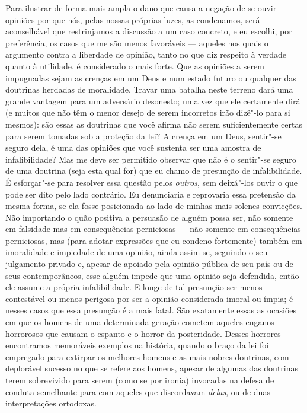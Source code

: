 Para ilustrar de forma mais ampla o dano que causa a negação de se ouvir
opiniões por que nós, pelas nossas próprias luzes, as condenamos, será
aconselhável que restrinjamos a discussão a um caso concreto, e eu
escolhi, por preferência, os casos que me são menos favoráveis ---
aqueles nos quais o argumento contra a liberdade de opinião, tanto no
que diz respeito à verdade quanto à utilidade, é
considerado o mais forte. Que as opiniões a serem impugnadas sejam
as crenças em um Deus e num estado futuro ou qualquer das doutrinas
herdadas de moralidade. Travar uma batalha neste terreno dará uma
grande vantagem para um adversário desonesto; uma vez que ele certamente
dirá (e muitos que não têm o menor desejo de serem incorretos irão
dizê"-lo para si mesmos): são essas as doutrinas que você afirma não
serem suficientemente certas para serem tomadas sob a proteção da lei?
A crença em um Deus, sentir"-se seguro dela, é uma das opiniões que você
sustenta ser uma amostra de infalibilidade? Mas me deve ser permitido
observar que não é o sentir"-se seguro de uma doutrina (seja esta qual
for) que eu chamo de presunção de infalibilidade. É esforçar"-se para
resolver essa questão pelos \textit{outros}, sem deixá"-los ouvir o
que pode ser dito pelo lado contrário. Eu denunciaria e reprovaria essa
pretensão da mesma forma, se ela fosse posicionada ao lado de minhas	\EP[-1]
mais solenes convicções. Não importando o quão positiva a persuasão de
alguém possa ser, não somente em falsidade mas em consequências
perniciosas --- não somente em consequências perniciosas, mas (para adotar
expressões que eu condeno fortemente) também em imoralidade e impiedade
de uma opinião, ainda assim se, seguindo o seu julgamento privado e,
apesar de apoiado pela opinião pública de seu país ou de seus
contemporâneos, esse alguém impede que uma opinião seja defendida, então ele
assume a própria infalibilidade. E longe de tal presunção ser menos
contestável ou menos perigosa por ser a opinião considerada imoral ou
ímpia; é nesses casos que essa presunção é a mais fatal. São exatamente
essas as ocasiões em que os homens de uma determinada geração
cometem aqueles enganos horrorosos que causam o espanto e o
horror da posteridade. Desses horrores encontramos memoráveis exemplos
na história, quando o braço da lei foi empregado para extirpar os
melhores homens e as mais nobres doutrinas, com deplorável sucesso no
que se refere aos homens, apesar de algumas das doutrinas terem
sobrevivido para serem (como se por ironia) invocadas na defesa de
conduta semelhante para com aqueles que discordavam \textit{delas}, ou
de duas interpretações ortodoxas. 

